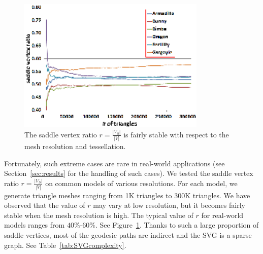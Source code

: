 \begin{figure}[htbp]
\centering
\includegraphics[width=0.8\textwidth]{figs/svg/saddle_ratio.png}
\vspace{-0.1in}
\caption{The saddle vertex ratio
$r=\frac{|V_S|}{|V|}$ is fairly stable with respect to the mesh
resolution and tessellation.}\label{fig:saddleratio}
\end{figure}
Fortunately, such extreme cases are rare in real-world applications
(see Section~\ref{sec:results} for the handling of such cases). We
tested the saddle vertex ratio $r=\frac{|V_S|}{|V|}$ on common
models of various resolutions. For each model, we generate triangle
meshes ranging from 1K triangles to 300K triangles. We have observed
that the value of $r$ may vary at low resolution, but it becomes
fairly stable when the mesh resolution is high. The typical value of
$r$ for real-world models ranges from $40\%$-$60\%$. See
Figure~\ref{fig:saddleratio}. Thanks to such a large proportion of
saddle vertices, most of the geodesic paths are indirect and the SVG
is a sparse graph. See Table~\ref{tab:SVGcomplexity}.


